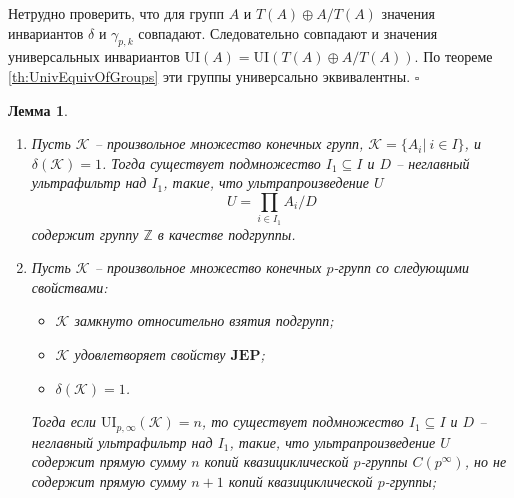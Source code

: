 \documentclass[a4paper,11pt,twoside]{article}
\newtheorem{lemma}{Лемма}[section]
\def\proof{{\noindent{\bf Доказательство.}} }
\def\K{{\mathcal{K}}}
\def\Z{{\mathbb{Z}}}
\def\ui{{\mathrm{UI}}}
\def\JEP{{\textbf{JEP}}}
\begin{document}
\proof Нетрудно проверить, что для групп $A$ и $T(A) \oplus A \big/ T(A)$ значения инвариантов $\delta$ и $\gamma_{p,k}$ совпадают. Следовательно совпадают и значения универсальных инвариантов $\ui(A) = \ui(T(A) \oplus A \big/ T(A))$. По теореме \ref{th:UnivEquivOfGroups} эти группы универсально эквивалентны. $\square$

\begin{lemma}\label{lemma:delta1UltraProduct}
\begin{enumerate}
\item Пусть $\K$ -- произвольное множество конечных групп, $\K = \{A_i | \ i \in I\}$, и $\delta(\K) = 1$. Тогда существует подмножество $I_1 \subseteq I$ и $D$ -- неглавный ультрафильтр над $I_1$, такие, что ультрапроизведение $U$
$$U = \prod_{i \in I_1} A_i \Big/ D$$
содержит группу $\Z$ в качестве подгруппы.

\item Пусть $\K$ -- произвольное множество конечных $p$-групп со следующими свойствами:
\begin{itemize}
\item $\K$ замкнуто относительно взятия подгрупп;
\item $\K$ удовлетворяет свойству $\JEP$;
\item $\delta(\K) = 1$.
\end{itemize}

Тогда если $\ui_{p,\infty}(\K) = n$, то существует подмножество $I_1 \subseteq I$ и $D$ -- неглавный ультрафильтр над $I_1$, такие, что ультрапроизведение $U$ содержит прямую сумму $n$ копий квазициклической $p$-группы $C(p^\infty)$, но не содержит прямую сумму $n+1$ копий квазициклической $p$-группы; 
\end{enumerate}
\end{lemma}
\end{document}
